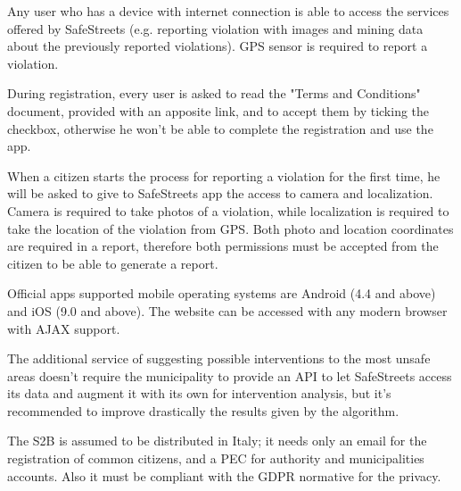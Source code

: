 Any user who has a device with internet connection is able to access the services offered by SafeStreets (e.g. reporting violation with images and mining data about the previously reported violations). GPS sensor is required to report a violation.

During registration, every user is asked to read the "Terms and Conditions" document, provided with an apposite link, and to accept them by ticking the checkbox, otherwise he won't be able to complete the registration and use the app.

When a citizen starts the process for reporting a violation for the first time, he will be asked to give to SafeStreets app the access to camera and localization. Camera is required to take photos of a violation, while localization is required to take the location of the violation from GPS. Both photo and location coordinates are required in a report, therefore both permissions must be accepted from the citizen to be able to generate a report.

Official apps supported mobile operating systems are Android (4.4 and above) and iOS (9.0 and above). The website can be accessed with any modern browser with AJAX support.

The additional service of suggesting possible interventions to the most unsafe areas doesn't require the municipality to provide an API to let SafeStreets access its data and augment it with its own for intervention analysis, but it's recommended to improve drastically the results given by the algorithm.

The S2B is assumed to be distributed in Italy; it needs only an email for the registration of common citizens, and a PEC for authority and municipalities accounts. Also it must be compliant with the GDPR normative for the privacy.